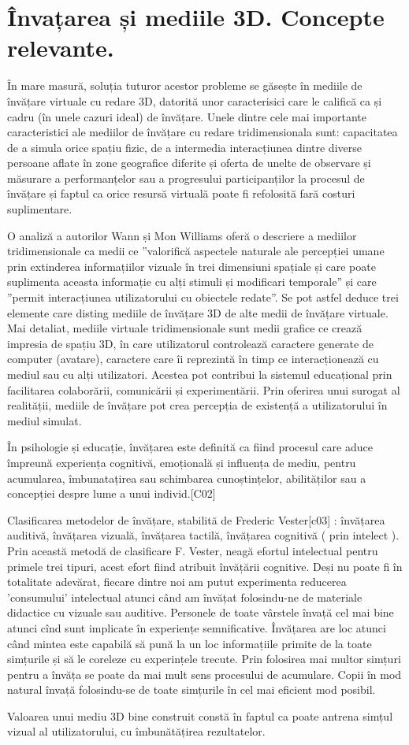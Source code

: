 \section{Învațarea și mediile 3D. Concepte relevante.}
\par În mare masură, soluția tuturor acestor probleme se găsește în mediile de învățare virtuale cu redare 3D, datorită unor caracterisici care le califică ca și cadru (în unele cazuri ideal) de învățare. Unele dintre cele mai importante caracteristici ale mediilor de învățare cu redare tridimensionala sunt: capacitatea de a simula orice spațiu fizic, de a intermedia interacțiunea dintre diverse persoane aflate în zone geografice diferite și oferta de unelte de observare și măsurare a performanțelor sau a progresului participanților la procesul de învățare și faptul ca orice resursă virtuală poate fi refolosită fară costuri suplimentare.
\par O analiză a autorilor Wann și Mon Williams oferă o descriere a mediilor tridimensionale ca medii ce ”valorifică aspectele naturale ale percepției umane prin extinderea informațiilor vizuale în trei dimensiuni spațiale și care poate suplimenta aceasta informație cu alți stimuli și modificari temporale”\cite{C01} și care ”permit interacțiunea utilizatorului cu obiectele redate”\cite{C01}. Se pot astfel deduce trei elemente care disting mediile de învățare 3D de alte medii de învățare virtuale. 	Mai detaliat, mediile virtuale tridimensionale sunt medii grafice ce crează impresia de spațiu 3D, în care utilizatorul controlează caractere generate de computer (avatare), caractere care îi reprezintă în timp ce interacționează cu mediul sau cu alți utilizatori. Acestea pot contribui la sistemul educațional prin facilitarea colaborării, comunicării și experimentării. Prin oferirea unui surogat al realității, mediile de învățare pot crea percepția de existență a utilizatorului în mediul simulat. 
\par În psihologie și educație, învățarea este definită ca fiind procesul care aduce împreună experiența cognitivă, emoțională și influența de mediu, pentru acumularea, îmbunatațirea sau schimbarea cunoștințelor, abilităților sau a concepției despre lume a unui individ.[C02]
\par Clasificarea metodelor de învățare, stabilită de Frederic Vester[c03] : învățarea auditivă, învățarea vizuală, învățarea tactilă, învățarea cognitivă ( prin intelect ). Prin această metodă de clasificare F. Vester, neagă efortul intelectual pentru primele trei tipuri, acest efort fiind atribuit învățării cognitive. Deși nu poate fi în totalitate adevărat, fiecare dintre noi am putut experimenta reducerea 'consumului' intelectual atunci când am învățat folosindu-ne de materiale didactice cu vizuale sau auditive. Personele de toate vârstele învață cel mai bine atunci cînd sunt implicate în experiențe semnificative. Învățarea are loc atunci când mintea este capabilă să pună la un loc informațiile primite de la toate simțurile și să le coreleze cu experințele trecute. Prin folosirea mai multor simțuri pentru a învăța se poate da mai mult sens procesului de acumulare. Copii în mod natural învață folosindu-se de toate simțurile în cel mai eficient mod posibil.
\par Valoarea unui mediu 3D bine construit constă în faptul ca poate antrena simțul vizual al utilizatorului, cu îmbunătățirea rezultatelor. 